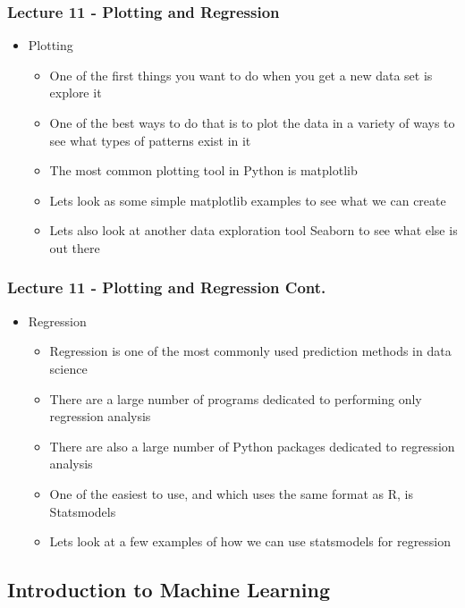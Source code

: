 \documentclass[mini frame in current subsection]{beamer}
\begin{document}
		\begin{frame}
			\frametitle{Lecture 11 - Plotting and Regression}
			\begin{itemize}
				\vfill\item  Plotting
					\begin{itemize}
						\vfill\item  One of the first things you want to do when you get a new data set is explore it
						\vfill\item  One of the best ways to do that is to plot the data in a variety of ways to see what types of patterns exist in it
						\vfill\item  The most common plotting tool in Python is matplotlib
						\vfill\item  Lets look as some simple matplotlib examples to see what we can create
						\vfill\item  Lets also look at another data exploration tool Seaborn to see what else is out there
					\end{itemize}
			\end{itemize}
		\end{frame}
		
		\begin{frame}
			\frametitle{Lecture 11 - Plotting and Regression Cont.}
			\begin{itemize}
				\vfill\item  Regression
					\begin{itemize}
						\vfill\item  Regression is one of the most commonly used prediction methods in data science
						\vfill\item  There are a large number of programs dedicated to performing only regression analysis
						\vfill\item  There are also a large number of Python packages dedicated to regression analysis
						\vfill\item  One of the easiest to use, and which uses the same format as R, is Statsmodels
						\vfill\item  Lets look at a few examples of how we can use statsmodels for regression
					\end{itemize}
			\end{itemize}
		\end{frame}
		
	\subsection{Introduction to Machine Learning}
	
\end{document}
